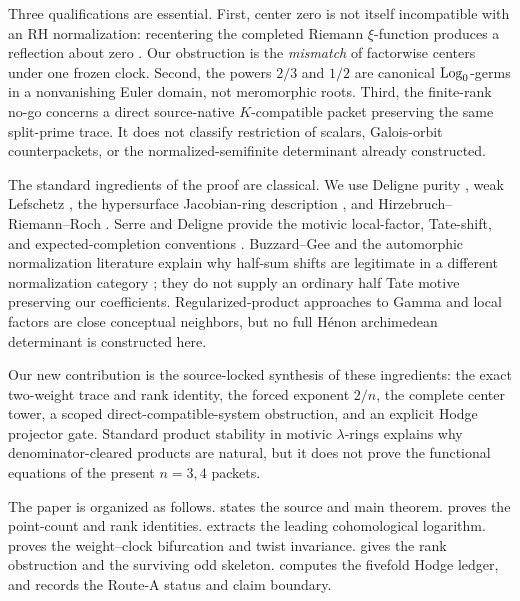 Three qualifications are essential.  First, center zero is not itself
incompatible with an RH normalization: recentering the completed Riemann
\(\xi\)-function produces a reflection about zero \cite{DLMF}.  Our
obstruction is the \emph{mismatch} of factorwise centers under one frozen
clock.  Second, the powers \(2/3\) and \(1/2\) are canonical
\(\operatorname{Log}_0\)-germs in a nonvanishing Euler domain, not meromorphic roots.
Third, the finite-rank no-go concerns a direct source-native
\(K\)-compatible packet preserving the same split-prime trace.  It does
not classify restriction of scalars, Galois-orbit counterpackets, or the
normalized-semifinite determinant already constructed.

The standard ingredients of the proof are classical.  We use Deligne
purity \cite{Deligne1974}, weak Lefschetz \cite{SGA2}, the
hypersurface Jacobian-ring description \cite{Griffiths1969II}, and
Hirzebruch--Riemann--Roch \cite{Hirzebruch1995}.  Serre and Deligne provide
the motivic local-factor, Tate-shift, and expected-completion conventions
\cite{Serre1970,Deligne1979}.  Buzzard--Gee and the automorphic
normalization literature explain why half-sum shifts are legitimate in a
different normalization category \cite{BuzzardGee2010,SST2014}; they do
not supply an ordinary half Tate motive preserving our coefficients.
Regularized-product approaches to Gamma and local factors
\cite{Quine1993,Deninger1991,Deninger1992} are close conceptual neighbors,
but no full H\'enon archimedean determinant is constructed here.

Our new contribution is the source-locked synthesis of these ingredients:
the exact two-weight trace and rank identity, the forced exponent \(2/n\),
the complete center tower, a scoped direct-compatible-system obstruction,
and an explicit Hodge projector gate.  Standard product stability in
motivic \(\lambda\)-rings \cite{Heinloth2007} explains why
denominator-cleared products are natural, but it does not prove the
functional equations of the present \(n=3,4\) packets.

The paper is organized as follows.   states the source and
main theorem.   proves the point-count and rank identities.
 extracts the leading cohomological logarithm.
 proves the weight--clock bifurcation and twist invariance.
 gives the rank obstruction and the surviving odd
skeleton.   computes the fivefold Hodge ledger, and
 records the Route-A status and claim boundary.
